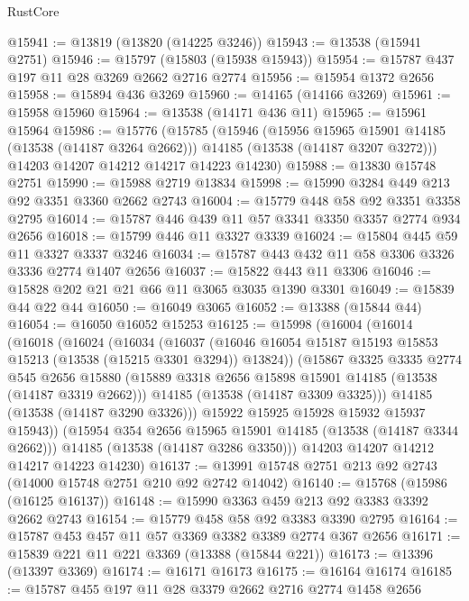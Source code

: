 \begin{lexlean}{RustCore}
\begin{coremodule}
@15941 := @13819 (@13820 (@14225 @3246))
@15943 := @13538 (@15941 @2751)
@15946 := @15797 (@15803 (@15938 @15943))
@15954 := @15787 @437 @197 @11 @28 @3269 @2662 @2716 @2774
@15956 := @15954 @1372 @2656
@15958 := @15894 @436 @3269
@15960 := @14165 (@14166 @3269)
@15961 := @15958 @15960
@15964 := @13538 (@14171 @436 @11)
@15965 := @15961 @15964
@15986 := @15776
    (@15785
      (@15946
        (@15956 @15965 @15901 @14185 (@13538 (@14187 @3264 @2662)))
        @14185
        (@13538 (@14187 @3207 @3272)))
      @14203
      @14207
      @14212
      @14217
      @14223
      @14230)
@15988 := @13830 @15748 @2751
@15990 := @15988 @2719 @13834
@15998 := @15990 @3284 @449 @213 @92 @3351 @3360 @2662 @2743
@16004 := @15779 @448 @58 @92 @3351 @3358 @2795
@16014 := @15787 @446 @439 @11 @57 @3341 @3350 @3357 @2774 @934 @2656
@16018 := @15799 @446 @11 @3327 @3339
@16024 := @15804 @445 @59 @11 @3327 @3337 @3246
@16034 := @15787 @443 @432 @11 @58 @3306 @3326 @3336 @2774 @1407 @2656
@16037 := @15822 @443 @11 @3306
@16046 := @15828 @202 @21 @21 @66 @11 @3065 @3035 @1390 @3301
@16049 := @15839 @44 @22 @44
@16050 := @16049 @3065
@16052 := @13388 (@15844 @44)
@16054 := @16050 @16052 @15253
@16125 := @15998
    (@16004
      (@16014
        (@16018
          (@16024
            (@16034
              (@16037
                (@16046 @16054 @15187 @15193 @15853 @15213 (@13538 (@15215 @3301 @3294)) @13824))
              (@15867
                @3325
                @3335
                @2774
                @545
                @2656
                @15880
                (@15889 @3318 @2656 @15898 @15901 @14185 (@13538 (@14187 @3319 @2662)))
                @14185
                (@13538 (@14187 @3309 @3325)))
              @14185
              (@13538 (@14187 @3290 @3326)))
            @15922
            @15925
            @15928
            @15932
            @15937
            @15943))
        (@15954 @354 @2656 @15965 @15901 @14185 (@13538 (@14187 @3344 @2662)))
        @14185
        (@13538 (@14187 @3286 @3350)))
      @14203
      @14207
      @14212
      @14217
      @14223
      @14230)
@16137 := @13991 @15748 @2751 @213 @92 @2743 (@14000 @15748 @2751 @210 @92 @2742 @14042)
@16140 := @15768 (@15986 (@16125 @16137))
@16148 := @15990 @3363 @459 @213 @92 @3383 @3392 @2662 @2743
@16154 := @15779 @458 @58 @92 @3383 @3390 @2795
@16164 := @15787 @453 @457 @11 @57 @3369 @3382 @3389 @2774 @367 @2656
@16171 := @15839 @221 @11 @221 @3369 (@13388 (@15844 @221))
@16173 := @13396 (@13397 @3369)
@16174 := @16171 @16173
@16175 := @16164 @16174
@16185 := @15787 @455 @197 @11 @28 @3379 @2662 @2716 @2774 @1458 @2656

\end{coremodule}
\end{lexlean}

